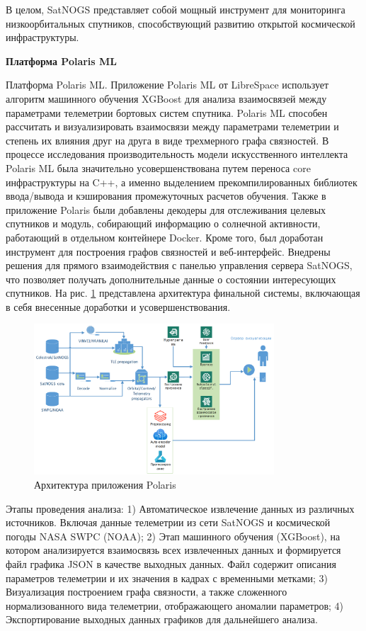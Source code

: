 ﻿\documentclass[14pt, a4paper]{extreport}
\begin{document}
В целом, SatNOGS представляет собой мощный инструмент для мониторинга низкоорбитальных спутников, способствующий развитию открытой космической инфраструктуры.

\newpage
{\Large \textbf{Платформа Polaris ML}}

Платформа Polaris ML. Приложение Polaris ML от LibreSpace использует алгоритм машинного обучения XGBoost для анализа взаимосвязей между параметрами телеметрии бортовых систем спутника. Polaris ML способен рассчитать и визуализировать взаимосвязи между параметрами телеметрии и степень их влияния друг на друга в виде трехмерного графа связностей. В процессе исследования производительность модели искусственного интеллекта Polaris ML была значительно усовершенствована путем переноса core инфраструктуры на C++, а именно выделением прекомпилированных библиотек ввода/вывода и кэширования промежуточных расчетов обучения. Также в приложение Polaris были добавлены декодеры для отслеживания целевых спутников и модуль, собирающий информацию о солнечной активности, работающий в отдельном контейнере Docker. Кроме того, был доработан инструмент для построения графов связностей и веб-интерфейс. Внедрены решения для прямого взаимодействия с панелью управления сервера SatNOGS, что позволяет получать дополнительные данные о состоянии интересующих спутников.
На рис. \ref{fig:polaris_architecture} представлена архитектура финальной системы, включающая в себя внесенные доработки и усовершенствования.

\begin{figure}[htbp]
	\centering
	\includegraphics[width=0.8\textwidth]{polaris_architecture.png}
	\caption{Архитектура приложения Polaris}
	\label{fig:polaris_architecture}
\end{figure}

Этапы проведения анализа: 1) Автоматическое извлечение данных из различных источников. Включая данные телеметрии из сети SatNOGS и космической погоды NASA SWPC (NOAA); 2) Этап машинного обучения \cite{xgboost}\cite{boumghar2018enhanced} (XGBoost), на котором анализируется взаимосвязь всех извлеченных данных и формируется файл графика JSON в качестве выходных данных. Файл содержит описания параметров телеметрии и их значения в кадрах с временными метками; 3) Визуализация построением графа связности, а также сложенного нормализованного вида телеметрии, отображающего аномалии параметров; 4) Экспортирование выходных данных графиков для дальнейшего анализа.
\end{document}
